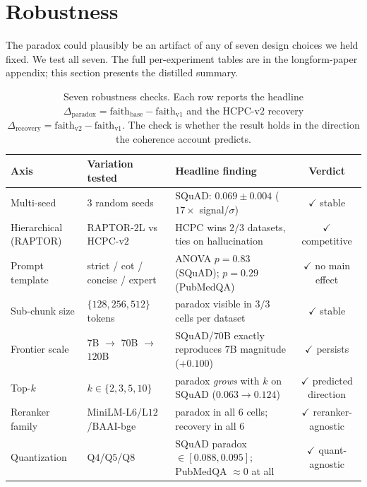 \section{Robustness}
\label{sec:robustness}

The paradox could plausibly be an artifact of any of seven design
choices we held fixed. We test all seven. The full per-experiment
tables are in the longform-paper appendix; this section presents the
distilled summary.

\begin{table}[!htb]
\centering
\caption{Seven robustness checks. Each row reports the headline
$\Delta_{\textrm{paradox}} = \textrm{faith}_{\textrm{base}} -
\textrm{faith}_{\textrm{v1}}$ and the HCPC-v$2$ recovery
$\Delta_{\textrm{recovery}} = \textrm{faith}_{\textrm{v2}} -
\textrm{faith}_{\textrm{v1}}$. The check is whether the result holds
in the direction the coherence account predicts.}
\label{tab:robustness_summary}
\footnotesize
\begin{tabular}{lllc}
\toprule
Axis & Variation tested & Headline finding & Verdict \\
\midrule
Multi-seed              & $3$ random seeds                    & SQuAD: $0.069 \pm 0.004$ ($17\times$ signal/$\sigma$)               & $\checkmark$ stable \\
Hierarchical (RAPTOR)   & RAPTOR-$2$L vs HCPC-v$2$            & HCPC wins $2/3$ datasets, ties on hallucination                    & $\checkmark$ competitive \\
Prompt template         & strict / cot / concise / expert     & ANOVA $p=0.83$ (SQuAD); $p=0.29$ (PubMedQA)                          & $\checkmark$ no main effect \\
Sub-chunk size          & $\{128, 256, 512\}$ tokens          & paradox visible in $3/3$ cells per dataset                          & $\checkmark$ stable \\
Frontier scale          & $7$B $\to$ $70$B $\to$ $120$B      & SQuAD/$70$B exactly reproduces $7$B magnitude ($+0.100$)            & $\checkmark$ persists \\
Top-$k$                 & $k \in \{2, 3, 5, 10\}$             & paradox \emph{grows} with $k$ on SQuAD ($0.063 \to 0.124$)          & $\checkmark$ predicted direction \\
Reranker family         & MiniLM-L$6$/L$12$/BAAI-bge          & paradox in all $6$ cells; recovery in all $6$                       & $\checkmark$ reranker-agnostic \\
Quantization            & Q$4$/Q$5$/Q$8$                      & SQuAD paradox $\in [0.088, 0.095]$; PubMedQA $\approx 0$ at all     & $\checkmark$ quant-agnostic \\

\end{tabular}
\end{table}
